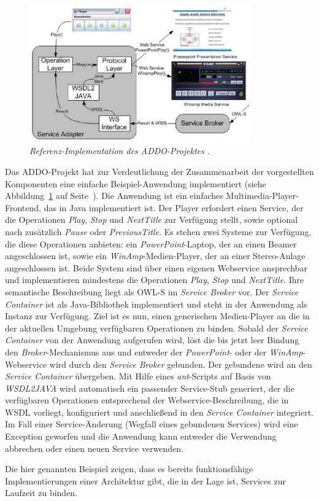 \begin{figure}[ht]
\centering
\parbox{0.85\textwidth}{
    \includegraphics[width=0.85\textwidth]{media/addo-player-example.png}
    \caption{\emph{Referenz-Implementation des \ac{ADDO}-Projektes} \cite[S.418]{flexbrok}.}
    \label{f:addo-player}
}
\end{figure}

Das \ac{ADDO}-Projekt hat zur Verdeutlichung der Zusammenarbeit der vorgestellten Komponenten eine einfache Beispiel-Anwendung implementiert (siehe Abbildung~\ref{f:addo-player} auf Seite~\pageref{f:addo-player}). Die Anwendung ist ein einfaches Multimedia-Player-Frontend, das in Java implementiert ist. Der Player erfordert einen Service, der die Operationen \emph{Play}, \emph{Stop} und \emph{NextTitle} zur Verfügung stellt, sowie optional nach zusätzlich \emph{Pause} oder \emph{PreviousTitle}. Es stehen zwei Systeme zur Verfügung, die diese Operationen anbieten: ein \emph{PowerPoint}-Laptop, der an einen Beamer angeschlossen ist, sowie ein \emph{WinAmp}-Medien-Player, der an einer Stereo-Anlage angeschlossen ist. Beide System sind über einen eigenen Webservice ansprechbar und implementieren mindestens die Operationen \emph{Play}, \emph{Stop} und \emph{NextTitle}. Ihre semantische Beschreibung liegt als \ac{OWL-S} im \emph{Service Broker} vor. Der \emph{Service Container} ist als Java-Bibliothek implementiert und steht in der Anwendung als Instanz zur Verfügung. Ziel ist es nun, einen generischen Medien-Player an die in der aktuellen Umgebung verfügbaren Operationen zu binden. Sobald der \emph{Service Container} von der Anwendung aufgerufen wird, löst die bis jetzt leer Bindung den \emph{Broker}-Mechanismus aus und entweder der \emph{PowerPoint}- oder der \emph{WinAmp}-Webservice wird durch den \emph{Service Broker} gebunden. Der gebundene wird an den \emph{Service Container} übergeben. Mit Hilfe eines \emph{ant}-Scripts auf Basis von \emph{WSDL2JAVA} wird automatisch ein passender Service-Stub generiert, der die verfügbaren Operationen entsprechend der Webservice-Beschreibung, die in \ac{WSDL} vorliegt, konfiguriert und anschließend in den \emph{Service Container} integriert. Im Fall einer Service-Änderung (Wegfall eines gebundenen Services) wird eine Exception geworfen und die Anwendung kann entweder die Verwendung abbrechen oder einen neuen Service verwenden.

\bigskip

Die hier genannten Beispiel zeigen, dass es bereits funktionsfähige Implementierungen einer Architektur gibt, die in der Lage ist, Services zur Laufzeit zu binden.